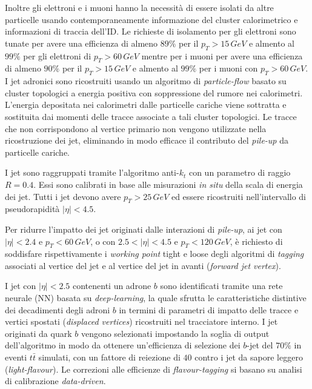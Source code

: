 \documentclass[11pt]{article}
\begin{document}
Inoltre gli elettroni e i muoni hanno la necessità di essere isolati da altre particelle usando contemporaneamente informazione del cluster calorimetrico e informazioni di traccia dell'ID. Le richieste di isolamento per gli elettroni sono tunate per avere una efficienza di almeno $89\%$ per il $p_T>15\,\unit{GeV}$ e almento al $99\%$ per gli elettroni di $p_T>60\,\unit{GeV}$ mentre per i muoni per avere una efficienza di almeno $90\%$ per il $p_T>15\,\unit{GeV}$ e almento al $99\%$ per i muoni con $p_T>60\,\unit{GeV}$.
I jet adronici sono ricostruiti usando un algoritmo di \textit{particle-flow} basato su cluster topologici a energia positiva con soppressione del rumore nei calorimetri. L'energia depositata nei calorimetri dalle particelle cariche viene sottratta e sostituita dai momenti delle tracce associate a tali cluster topologici. Le tracce che non corrispondono al vertice primario non vengono utilizzate nella ricostruzione dei jet, eliminando in modo efficace il contributo del \textit{pile-up} da particelle cariche. 

I jet sono raggruppati tramite l'algoritmo anti-$k_t$ con un parametro di raggio $R = 0.4$. Essi sono calibrati in base alle misurazioni \textit{in situ} della scala di energia dei jet. Tutti i jet devono avere $p_T > 25\,\unit{GeV}$ ed essere ricostruiti nell'intervallo di pseudorapidità $|\eta| < 4.5$. 

Per ridurre l'impatto dei jet originati dalle interazioni di \textit{pile-up}, ai jet con $|\eta| < 2.4$ e $p_T < 60\,\unit{GeV}$, o con $2.5 < |\eta| < 4.5$ e $p_T < 120\,\unit{GeV}$, è richiesto di soddisfare rispettivamente i \textit{working point} tight e loose degli algoritmi di \textit{tagging} associati al vertice del jet e al vertice del jet in avanti (\textit{forward jet vertex}). 

I jet con $|\eta| < 2.5$ contenenti un adrone $b$ sono identificati tramite una rete neurale (NN) basata su \textit{deep-learning}, la quale sfrutta le caratteristiche distintive dei decadimenti degli adroni $b$ in termini di parametri di impatto delle tracce e vertici spostati (\textit{displaced vertices}) ricostruiti nel tracciatore interno. I jet originati da quark $b$ vengono selezionati impostando la soglia di output dell'algoritmo in modo da ottenere un'efficienza di selezione dei $b$-jet del $70\%$ in eventi $t\bar{t}$ simulati, con un fattore di reiezione di $40$ contro i jet da sapore leggero (\textit{light-flavour}). Le correzioni alle efficienze di \textit{flavour-tagging} si basano su analisi di calibrazione \textit{data-driven}.
\end{document}
